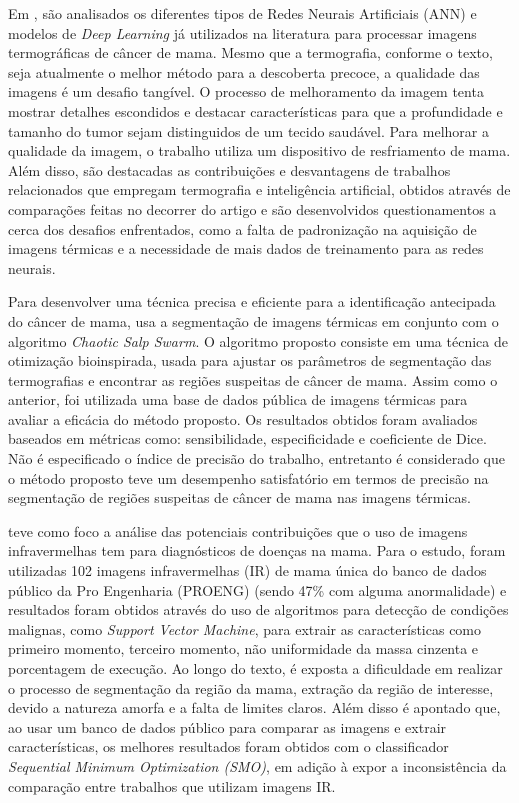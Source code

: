 Em , são analisados os diferentes tipos de Redes Neurais Artificiais (ANN) e modelos de \textit{Deep Learning} já utilizados na literatura para processar imagens termográficas de câncer de mama. Mesmo que a termografia, conforme o texto, seja atualmente o melhor método para a descoberta precoce, a qualidade das imagens é um desafio tangível. O processo de melhoramento da imagem tenta mostrar detalhes escondidos e  destacar características para que a profundidade e tamanho do tumor sejam distinguidos de um tecido saudável. Para melhorar a qualidade da imagem, o trabalho utiliza um dispositivo de resfriamento de mama. Além disso, são destacadas as contribuições e desvantagens de trabalhos relacionados que empregam termografia e inteligência artificial, obtidos através de comparações feitas no decorrer do artigo e são desenvolvidos questionamentos a cerca dos desafios enfrentados, como a falta de padronização na aquisição de imagens térmicas e a necessidade de mais dados de treinamento para as redes neurais. 

Para desenvolver uma técnica precisa e eficiente para a identificação antecipada do câncer de mama,  usa a segmentação de imagens térmicas em conjunto com o algoritmo \textit{Chaotic Salp Swarm}. O algoritmo proposto consiste em uma técnica de otimização bioinspirada, usada para ajustar os parâmetros de segmentação das termografias e encontrar as regiões suspeitas de câncer de mama. Assim como o anterior, foi utilizada uma base de dados pública de imagens térmicas para avaliar a eficácia do método proposto. Os resultados obtidos foram avaliados baseados em métricas como: sensibilidade, especificidade e coeficiente de Dice. Não é especificado o índice de precisão do trabalho, entretanto é considerado que o método proposto teve um desempenho satisfatório em termos de precisão na segmentação de regiões suspeitas de câncer de mama nas imagens térmicas.

 teve como foco a análise das potenciais contribuições que o uso de imagens infravermelhas tem para diagnósticos de doenças na mama. Para o estudo, foram utilizadas 102 imagens infravermelhas (IR) de mama única do banco de dados público da Pro Engenharia (PROENG) (sendo 47\% com alguma anormalidade) e resultados foram obtidos através do uso de algoritmos para detecção de condições malignas, como \textit{Support Vector Machine}, para extrair as características como primeiro momento, terceiro momento, não uniformidade da massa cinzenta e porcentagem de execução. Ao longo do texto, é exposta a dificuldade em realizar o processo de segmentação da região da mama, extração da região de interesse, devido a natureza amorfa e a falta de limites claros. Além disso é apontado que, ao usar um banco de dados público para comparar as imagens e extrair características, os melhores resultados foram obtidos com o classificador \textit{Sequential Minimum Optimization (SMO)}, em adição à expor a inconsistência da comparação entre trabalhos que utilizam imagens IR. 

